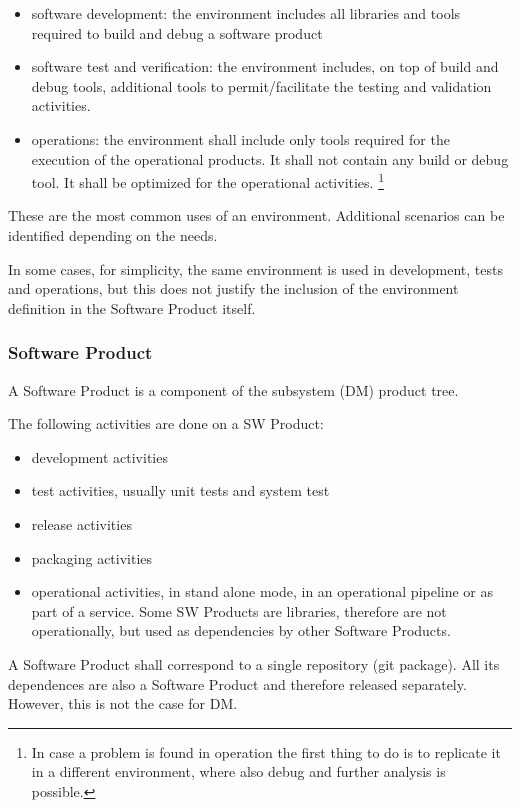 \begin{itemize}
\item software development: the environment includes all libraries and tools required to build and debug a software product
\item software test and verification: the environment includes, on top of build and debug tools, additional tools to permit/facilitate the testing and validation activities.
\item operations: the environment shall include only tools required for the execution of the operational products. It shall not contain any build or debug tool. It shall be optimized for the operational activities. \footnote{In case a problem is found in operation the first thing to do is to replicate it in a different environment, where also debug and further analysis is possible.}
\end{itemize}

These are the most common uses of an environment. Additional scenarios can be identified depending on the needs.

In some cases, for simplicity, the same environment is used in development, tests and operations, but this does not justify the inclusion of the environment definition in the Software Product itself.


\subsubsection{Software Product} \label{sec:swdef}

A Software Product is a component of the subsystem (DM) product tree.

The following activities are done on a SW Product:
\begin{itemize}
\item development activities
\item test activities, usually unit tests and system test
\item release activities
\item packaging activities
\item operational activities, in stand alone mode, in an operational pipeline or as part of a service. Some SW Products are libraries, therefore are not operationally, but used as dependencies by other Software Products.
\end{itemize}

A Software Product shall correspond to a single repository (git package). All its dependences are also a Software Product and therefore released separately. However, this is not the case for DM.

